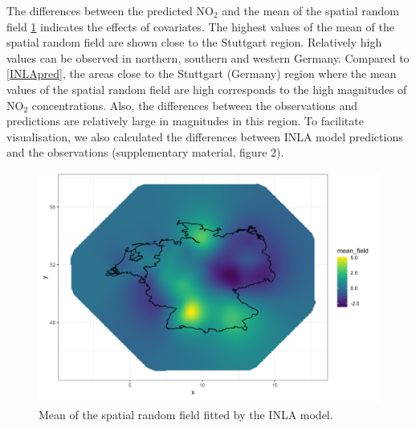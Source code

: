 \documentclass{article}
\begin{document}
The differences between the predicted NO$_2$ and the mean of the spatial random field \cref{randomfield} indicates the effects of covariates. The highest values of the mean of the spatial random field are shown close to the Stuttgart region. Relatively high values can be observed in northern, southern and western Germany. Compared to \cref{INLApred}, the areas close to the Stuttgart (Germany) region where the mean values of the spatial random field are high corresponds to the high magnitudes of NO$_2$ concentrations. Also, the differences between the observations and predictions are relatively large in magnitudes in this region. To facilitate visualisation, we also calculated the differences between INLA model predictions and the observations  (supplementary material, figure 2).  

 
  

\begin{figure}
\centering
\includegraphics[scale = 0.5]{fig/mean_randomfield.png}
\caption{Mean of the spatial random field fitted by the INLA model.}
\label{randomfield}
\end{figure}
\end{document}
